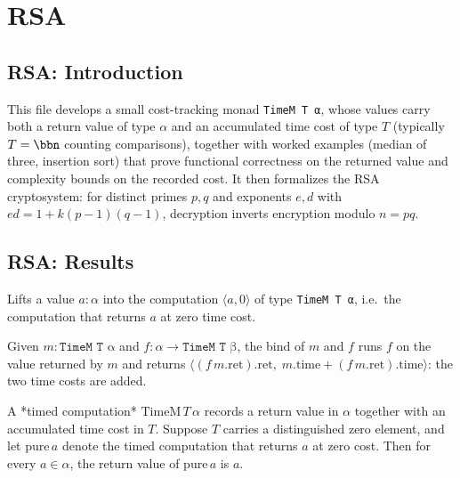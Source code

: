 \section{RSA}
\subsection*{RSA: Introduction}

This file develops a small cost-tracking monad \texttt{TimeM T α}, whose values carry both a
return value of type $\alpha$ and an accumulated time cost of type $T$ (typically $T = \bbn$
counting comparisons), together with worked examples (median of three, insertion sort) that
prove functional correctness on the returned value and complexity bounds on the recorded cost.
It then formalizes the RSA cryptosystem: for distinct primes $p,q$ and exponents $e,d$ with
$ed = 1 + k(p-1)(q-1)$, decryption inverts encryption modulo $n = pq$.

\subsection*{RSA: Results}

\begin{definition}
\label{TimeM.pure}
\leanok
Lifts a value $a : \alpha$ into the computation $\langle a, 0\rangle$ of type \texttt{TimeM T α},
i.e.\ the computation that returns $a$ at zero time cost.
\end{definition}

\begin{definition}
\label{TimeM.bind}
\leanok
Given $m : \texttt{TimeM T α}$ and $f : \alpha \to \texttt{TimeM T β}$, the bind of $m$ and $f$
runs $f$ on the value returned by $m$ and returns $\langle (f\,m.\mathrm{ret}).\mathrm{ret},\;
m.\mathrm{time} + (f\,m.\mathrm{ret}).\mathrm{time}\rangle$: the two time costs are added.
\end{definition}

\begin{theorem}
\label{TimeM.ret_pure}
\leanok
{}
A *timed computation* $\mathrm{TimeM}\,T\,\alpha$ records a return value in $\alpha$
together with an accumulated time cost in $T$. Suppose $T$ carries a distinguished zero
element, and let $\mathrm{pure}\,a$ denote the timed computation that returns $a$ at
zero cost. Then for every $a \in \alpha$, the return value of $\mathrm{pure}\,a$ is $a$.
\end{theorem}

